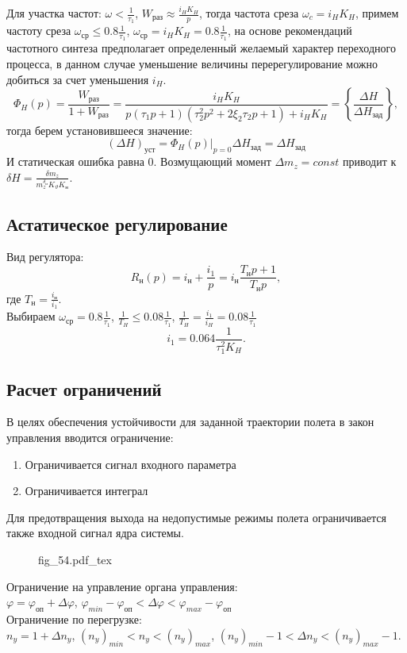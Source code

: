 \documentclass{article}
\newcommand{\incfig}[1]{
    {#1.pdf_tex}
}
\begin{document}
Для участка частот:
$\omega < \frac{1}{\tau_1}$, $W_\text{раз} \approx \frac{i_H K_H }{p} $, тогда
частота среза $\omega_c = i_H  K_H$, примем частоту среза $\omega_\text{ср} \le
0.8 \frac{1}{\tau_1}$, $\omega_\text{ср} = i_H K_H =0.8 \frac{1}{\tau_1} $, на
основе рекомендаций частотного синтеза предполагает определенный желаемый
характер переходного процесса, в данном случае уменьшение величины
перерегулирование можно добиться за счет уменьшения $i_H$.
\[
    \Phi_H (p) =\frac{W_\text{раз}}{1 + W_\text{раз}} =\frac{i_H K_H}{p(\tau_1
    p +1)(\tau_2^2 p^2 + 2 \xi_2 \tau_2 p + 1) + i_H K_H} = \left\{
    \frac{\Delta H}{\Delta H_\text{зад}} \right\},
\]
тогда берем установившееся значение:
\[
    (\Delta H)_\text{уст} = \Phi_H(p)|_{p=0} \Delta H_\text{зад} = \Delta
    H_\text{зад}
\]
И статическая ошибка равна 0. Возмущающий момент $\Delta m_z = const$ приводит
к $\delta H =\frac{\delta m_z}{m_z^{\delta_\text{н}} K_\vartheta K_\text{н}}$.

\subsection{Астатическое регулирование}
Вид регулятора:
\[
    R_\text{н}(p) = i_\text{н} +\frac{i_1}{p}  = i_\text{н} \frac{T_\text{н} p
    + 1}{T_\text{н} p},
\]
где $T_\text{н} =\frac{i_\text{н}}{i_1}$.\\
Выбираем $\omega_\text{ср} = 0.8 \frac{1}{\tau_1}$, $\frac{1}{T_H} \le
0.08\frac{1}{\tau_1}$, $\frac{1}{T_H} = \frac{i_1}{i_H} = 0.08\frac{1}{\tau_1}$
\[
    i_1 = 0.064 \frac{1}{\tau_1^2 K_H}
    .\]

\subsection{Расчет ограничений}
В целях обеспечения устойчивости для заданной траектории полета в закон
управления вводится ограничение:
\begin{enumerate}
    \item Ограничивается сигнал входного параметра
    \item Ограничивается интеграл
\end{enumerate}

Для предотвращения выхода на недопустимые режимы полета ограничивается также
входной сигнал ядра системы.
\begin{figure}[H]
    \centering
    \incfig{fig_54}
    \label{fig:fig_54}
\end{figure}

Ограничение на управление органа управления:\\
$\varphi = \varphi_\text{оп} + \Delta \varphi$, $\varphi_{min} -
\varphi_\text{оп} < \Delta \varphi < \varphi_{max} - \varphi_\text{оп}$\\
Ограничение по перегрузке:\\
$n_y = 1 + \Delta n_y$, $(n_y)_{min} < n_y < (n_y)_{max}$, $(n_y)_{min} - 1 <
\Delta n_y < (n_y)_{max} - 1$.
\end{document}
